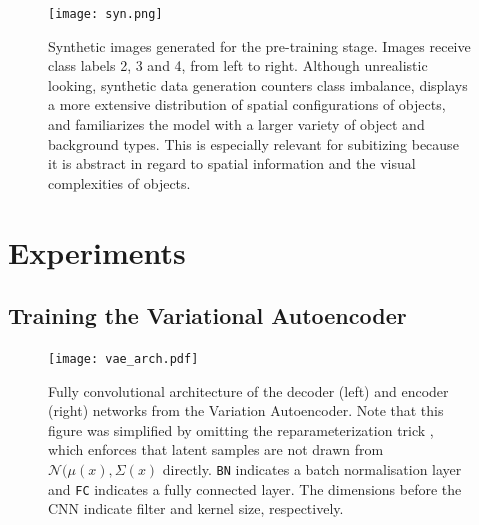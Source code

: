 \documentclass[twocolumn]{article}
\begin{document}
\begin{figure}
\centering
\texttt{[image: syn.png]}
\caption{Synthetic images generated for the pre-training stage. Images receive class labels 2, 3 and 4, from left to right. Although unrealistic looking, synthetic data generation counters class imbalance, displays a more extensive distribution of spatial configurations of objects, and familiarizes the model with a larger variety of object and background types. This is especially relevant for subitizing because it is abstract in regard to spatial information and the visual complexities of objects.}
\label{fig:syn}
\end{figure}

\newpage
\hypertarget{experiments}{%
\section{Experiments}\label{experiments}}

\hypertarget{vae-train}{%
\subsection{Training the Variational Autoencoder} \label{vae-train}}

\begin{figure}
\centering
\texttt{[image: vae\_arch.pdf]}
\caption{Fully convolutional architecture of the decoder (left) and encoder (right) networks from the Variation Autoencoder. Note that this figure was simplified by omitting the reparameterization trick \citep{kingma2013auto}, which enforces that latent samples are not drawn from \(\mathcal{N}(\mu(x), \Sigma(x)\) directly. \texttt{BN} indicates a batch normalisation layer \citep{ioffe2015batch} and \texttt{FC} indicates a fully connected layer. The dimensions before the CNN indicate filter and kernel size, respectively.}
\label{fig:vae-arch}
\end{figure}
\end{document}
